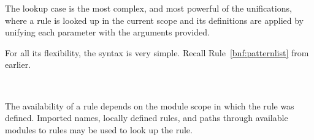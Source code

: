 The lookup case is the most complex, and most powerful of the unifications,
where a rule is looked up in the current scope and its definitions are applied
by unifying each parameter with the arguments provided.

For all its flexibility, the syntax is very simple. Recall Rule~\ref{bnf:patternlist}
from earlier.

\begin{bnf*}
     \\
\end{bnf*}

The availability of a rule depends on the module scope in which the rule was defined.
Imported names, locally defined rules, and paths through available modules to rules
may be used to look up the rule.


\begin{prooftree}
\end{prooftree}
